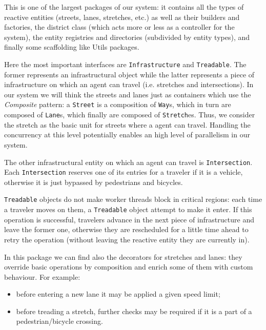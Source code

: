 This is one of the largest packages of our system: it contains all the types of
reactive entities (streets, lanes, stretches, etc.) as well as their builders
and factories, the district class (which acts more or less as a controller for
the system), the entity registries and directories (subdivided by entity types),
and finally some scaffolding like Utils packages.

Here the most important interfaces are \texttt{Infrastructure} and
\texttt{Treadable}. The former represents an infrastructural object while the
latter represents a piece of infrastructure on which an agent can travel
(i.e. stretches and intersections).
In our system we will think the streets and lanes just as containers
which use the
\textit{Composite} pattern: a \texttt{Street} is a composition of \texttt{Way}s,
which in turn are composed of \texttt{Lane}s, which finally are composed of
\texttt{Stretch}es.
Thus, we consider the stretch as the basic unit
for streets where a agent can travel.
Handling the concurrency at this level potentially enables
an high level of  parallelism in our system.

The other infrastructural entity on which an agent can travel is
\texttt{Intersection}. Each \texttt{Intersection} reserves one of its
entries for a traveler if it is a vehicle, otherwise it is just bypassed by
pedestrians and bicycles.

\texttt{Treadable} objects do not make worker threads block in critical regions:
each
time a traveler moves on them, a \texttt{Treadable} object attempt to make it
enter. If this
operation is successful, travelers advance in the next piece of infrastructure
and leave the former one, otherwise they are rescheduled for a little time ahead
to retry the operation (without leaving the reactive entity they are currently
in).

In this package we can find also the decorators for stretches and lanes: they
override basic operations by composition and enrich some of them with custom
behaviour. For example:

\begin{itemize}
  \item before entering a new lane it may be applied a given speed limit;
  \item before treading a stretch, further checks may be required if it is a
    part of a pedestrian/bicycle crossing.
 \end{itemize}
